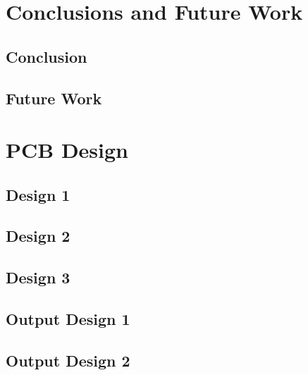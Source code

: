 \documentclass[12pt,openany,a4paper]{book}
\begin{document}
\chapter{Conclusions and Future Work}

\section{Conclusion}


\section{Future Work}







\appendix
{}


\newpage
\chapter{PCB Design}
\section{Design 1}	\label{sec:pcb_design1}

\section{Design 2}	\label{sec:pcb_design2}

\section{Design 3}	\label{sec:pcb_design3}

\section{Output Design 1}	\label{sec:pcb_outdesign1}

\section{Output Design 2}	\label{sec:pcb_outdesign2}
\end{document}
